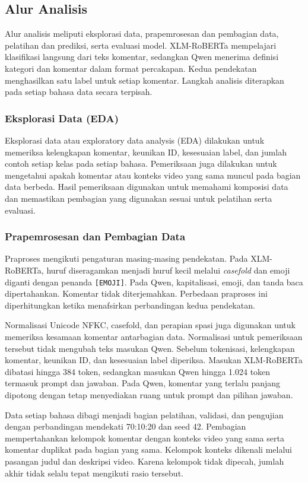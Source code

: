 \documentclass[11pt]{article}
\begin{document}
\subsection{Alur Analisis}
Alur analisis meliputi eksplorasi data, prapemrosesan dan pembagian data, pelatihan dan prediksi, serta evaluasi model. XLM-RoBERTa mempelajari klasifikasi langsung dari teks komentar, sedangkan Qwen menerima definisi kategori dan komentar dalam format percakapan. Kedua pendekatan menghasilkan satu label untuk setiap komentar. Langkah analisis diterapkan pada setiap bahasa data secara terpisah.

\subsubsection{Eksplorasi Data (EDA)}
Eksplorasi data atau exploratory data analysis (EDA) dilakukan untuk memeriksa kelengkapan komentar, keunikan ID, kesesuaian label, dan jumlah contoh setiap kelas pada setiap bahasa. Pemeriksaan juga dilakukan untuk mengetahui apakah komentar atau konteks video yang sama muncul pada bagian data berbeda. Hasil pemeriksaan digunakan untuk memahami komposisi data dan memastikan pembagian yang digunakan sesuai untuk pelatihan serta evaluasi.

\subsubsection{Prapemrosesan dan Pembagian Data}
Praproses mengikuti pengaturan masing-masing pendekatan. Pada XLM-RoBERTa, huruf diseragamkan menjadi huruf kecil melalui \textit{casefold} dan emoji diganti dengan penanda \texttt{[EMOJI]}. Pada Qwen, kapitalisasi, emoji, dan tanda baca dipertahankan. Komentar tidak diterjemahkan. Perbedaan praproses ini diperhitungkan ketika menafsirkan perbandingan kedua pendekatan.

Normalisasi Unicode NFKC, casefold, dan perapian spasi juga digunakan untuk memeriksa kesamaan komentar antarbagian data. Normalisasi untuk pemeriksaan tersebut tidak mengubah teks masukan Qwen. Sebelum tokenisasi, kelengkapan komentar, keunikan ID, dan kesesuaian label diperiksa. Masukan XLM-RoBERTa dibatasi hingga 384 token, sedangkan masukan Qwen hingga 1.024 token termasuk prompt dan jawaban. Pada Qwen, komentar yang terlalu panjang dipotong dengan tetap menyediakan ruang untuk prompt dan pilihan jawaban.

Data setiap bahasa dibagi menjadi bagian pelatihan, validasi, dan pengujian dengan perbandingan mendekati 70:10:20 dan seed 42. Pembagian mempertahankan kelompok komentar dengan konteks video yang sama serta komentar duplikat pada bagian yang sama. Kelompok konteks dikenali melalui pasangan judul dan deskripsi video. Karena kelompok tidak dipecah, jumlah akhir tidak selalu tepat mengikuti rasio tersebut.
\end{document}
